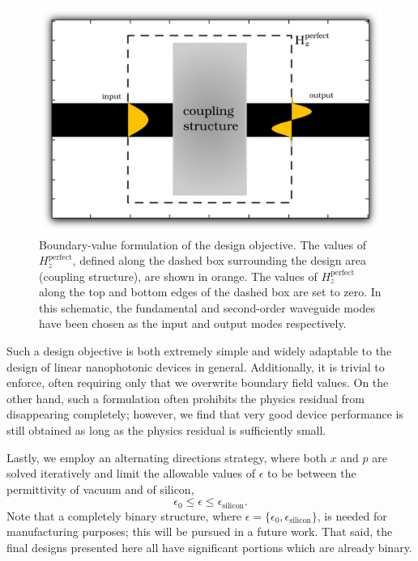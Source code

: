 \documentclass[letterpaper,10pt]{article}
\begin{document}
\begin{figure}[htb]
    \centering
    \includegraphics[width=\textwidth]{intro} 
    \caption{Boundary-value formulation of the design objective.
        The values of $H_z^\text{perfect}$, 
            defined along the dashed box surrounding the design area
            (coupling structure), 
            are shown in orange. 
        The values of $H_z^\text{perfect}$ along the top and bottom edges
            of the dashed box are set to zero.
        In this schematic, the fundamental and second-order waveguide modes
            have been chosen as the input and output modes respectively.}
    \label{fig:intro}
\end{figure}
    
Such a design objective is both extremely simple and widely adaptable 
    to the design of linear nanophotonic devices in general.
Additionally, it is trivial to enforce,
    often requiring only that we overwrite boundary field values.
On the other hand, such a formulation often prohibits the physics residual 
    from disappearing completely; 
    however, we find that very good device performance is still obtained
    as long as the physics residual is sufficiently small.

Lastly, we employ an alternating directions strategy,
    where both $x$ and $p$ are solved iteratively\cite{prevwork}
    and limit the allowable values of $\epsilon$ to be between
    the permittivity of vacuum and of silicon,
    \begin{equation}
    \epsilon_0 \le \epsilon \le \epsilon_\text{silicon}.
    \end{equation}
Note that a completely binary structure,
    where $\epsilon = \{\epsilon_0, \epsilon_\text{silicon}\}$,
    is needed for manufacturing purposes; this will be pursued in a future work.
That said, the final designs presented here 
    all have significant portions which are already binary.
\end{document}
